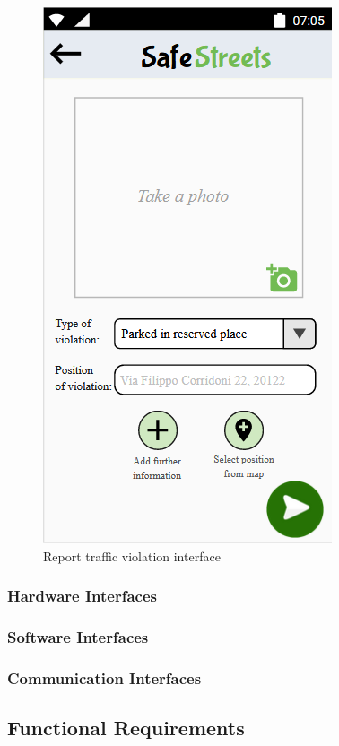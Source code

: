         \begin{figure}[h]
        \centering
        \includegraphics[scale=0.5]{Images/report_violation.png}
        \caption{Report traffic violation interface}
    \end{figure}
\subsubsection{Hardware Interfaces}

\subsubsection{Software Interfaces}

\subsubsection{Communication Interfaces}

\subsection{Functional Requirements}


